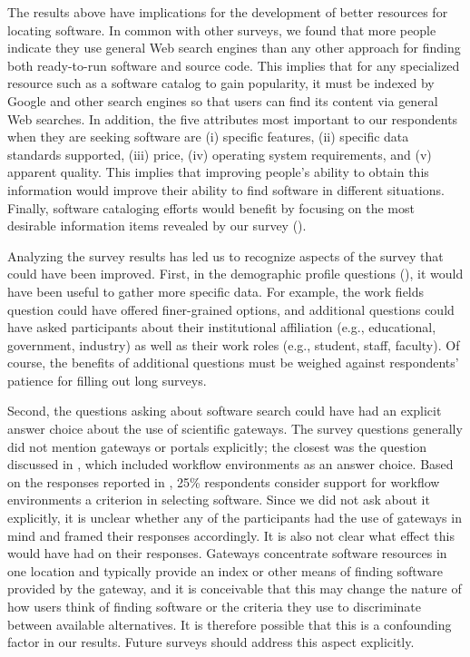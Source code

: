 \documentclass{casicswhitepaper}
\begin{document}
The results above have implications for the development of better resources for locating software.  In common with other surveys, we found that more people indicate they use general Web search engines than any other approach for finding both ready-to-run software and source code.  This implies that for any specialized resource such as a software catalog to gain popularity, it must be indexed by Google and other search engines so that users can find its content via general Web searches.  In addition, the five attributes most important to our respondents when they are seeking software are (i) specific features, (ii) specific data standards supported, (iii) price, (iv) operating system requirements, and (v) apparent quality.  This implies that improving people's ability to obtain this information would improve their ability to find software in different situations.  Finally, software cataloging efforts would benefit by focusing on the most desirable information items revealed by our survey ().


Analyzing the survey results has led us to recognize aspects of the survey that could have been improved.  First, in the demographic profile questions (), it would have been useful to gather more specific data.  For example, the work fields question could have offered finer-grained options, and additional questions could have asked participants about their institutional affiliation (e.g., educational, government, industry) as well as their work roles (e.g., student, staff, faculty).  Of course, the benefits of additional questions must be weighed against respondents' patience for filling out long surveys.

Second, the questions asking about software search could have had an explicit answer choice about the use of scientific gateways.  The survey questions generally did not mention gateways or portals explicitly; the closest was the question discussed in , which included workflow environments as an answer choice.  Based on the responses reported in , 25\% respondents consider support for workflow environments a criterion in selecting software.  Since we did not ask about it explicitly, it is unclear whether any of the participants had the use of gateways in mind and framed their responses accordingly.  It is also not clear what effect this would have had on their responses.  Gateways concentrate software resources in one location and typically provide an index or other means of finding software provided by the gateway, and it is conceivable that this may change the nature of how users think of finding software or the criteria they use to discriminate between available alternatives.  It is therefore possible that this is a confounding factor in our results.  Future surveys should address this aspect explicitly.
\end{document}
